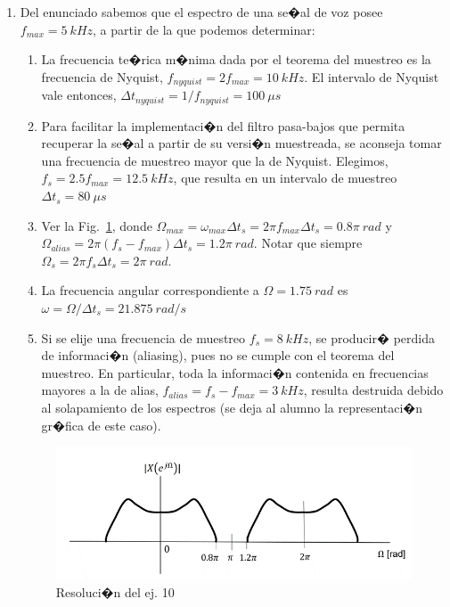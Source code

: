 \documentclass[10pt,a4paper]{article}
\begin{document}
\begin{enumerate}
\item Del enunciado sabemos que el espectro de una se�al de voz posee $f_{max}=5~kHz$, a partir de la que 
podemos determinar:
\begin{enumerate}
	\item La frecuencia te�rica m�nima dada por el teorema del muestreo es la frecuencia de Nyquist, 
	$f_{nyquist}=2f_{max}=10 ~kHz$. El intervalo de Nyquist vale entonces,  
	$\Delta t_{nyquist}=1/f_{nyquist}=100~\mu s$
	\item Para facilitar la implementaci�n del filtro pasa-bajos que permita recuperar la se�al a partir de su versi�n 
	muestreada, se aconseja tomar una frecuencia de muestreo mayor que la de Nyquist. Elegimos,  
	$f_{s}=2.5f_{max}=12.5~kHz$, que resulta en un intervalo de muestreo $\Delta t_s=80~\mu s$
	\item  Ver la Fig.~\ref{fig:ej_10}, donde $\Omega_{max}=\omega_{max}\Delta t_s=2\pi f_{max}\Delta t_s=0.8\pi~rad$ 
	y 
	$\Omega_{alias}=2\pi (f_{s}-f_{max})\Delta t_s=1.2\pi~rad$. Notar que siempre $\Omega_{s}=2\pi f_{s}\Delta 
	t_s=2\pi~rad$.
	\item La frecuencia angular correspondiente a $\Omega=1.75~rad$ es $\omega=\Omega/\Delta t_s= 21.875~rad/s$
	\item Si se elije una frecuencia de muestreo $f_s=8~kHz$, se producir� perdida de informaci�n (aliasing), pues no 
	se cumple con el teorema del muestreo. En particular, toda la informaci�n contenida en frecuencias mayores a la de  
	alias, $f_{alias}=f_s-f_{max}=3~kHz$, resulta destruida debido al solapamiento de los espectros (se deja al alumno 
	la representaci�n gr�fica de este caso). 
\end{enumerate} 

\begin{figure}[h]
	\begin{center}
		\includegraphics[width=14cm]{tp8_ej10.png}
	\end{center}
	\caption{Resoluci�n del ej. 10}
	\label{fig:ej_10}
\end{figure}



\end{enumerate}
\end{document}
